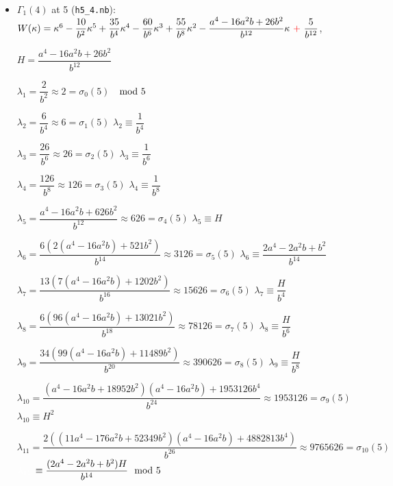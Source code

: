 \documentclass{rs}
\theoremstyle{definition}
\theoremstyle{remark}
\newcommand{\md}{~~{\rm mod}~}
\newcommand{\G}{\Gamma}
\newcommand{\K}{\kappa}
\renewcommand{\l}{\lambda}
\newcommand{\si}{\sigma}
\renewcommand{\=}{\approx}
\renewcommand{\-}{\sim}
\numberwithin{equation}{section}
\numberwithin{thm}{section}
\begin{document}
\begin{itemize}
 $\l_{-5} = -\dfrac{a^2 (a^{18} - 95 a^{15} b + 3485 a^{12} b^2 - 61465 a^9 b^3 + 524355 a^6 b^4 - 1871224 a^3 b^5 + 1739375 b^6)}{-15625} \= \dfrac{15624}{15625} = -(\si_{-6}(5) - 2)$ 

 $\l_{-6} = (a^{24} - 114 a^{21} b + 5265 a^{18} b^2 - 125780 a^{15} b^3 + 1641540 a^{12} b^4 - 11300694 a^9 b^5 + 35837606 a^6 b^6 - 36714000 a^3 b^7 + 3018750 b^8) / 78125 
 \= \dfrac{78126}{78125} = \si_{-7}(5)$ 

 \item $\G_1(4)$ at 5 (\texttt{h5\_4.nb}): $W(\K) = \K^6 - \dfrac{10}{b^2} \K^5 + \dfrac{35}{b^4} \K^4 - \dfrac{60}{b^6} \K^3 + \dfrac{55}{b^8} \K^2 
 - \dfrac{a^4 - 16 a^2 b + 26 b^2}{b^{12}} \K ~\textcolor{red}{+}~ \dfrac{5}{b^{12}}$, 

 \hfill $H = \dfrac{a^4 - 16 a^2 b + 26 b^2}{b^{12}}$ 

 $\l_1 = \dfrac{2}{b^2} \= 2 = \si_0(5)$ \hfill $\md 5$

 $\l_2 = \dfrac{6}{b^4} \= 6 = \si_1(5)$ \hfill $\l_2 \equiv \dfrac{1}{b^4}$ 

 $\l_3 = \dfrac{26}{b^6} \= 26 = \si_2(5)$ \hfill $\l_3 \equiv \dfrac{1}{b^6}$ 

 $\l_4 = \dfrac{126}{b^8} \= 126 = \si_3(5)$ \hfill $\l_4 \equiv \dfrac{1}{b^8}$ 

 $\l_5 = \dfrac{a^4 - 16 a^2 b + 626 b^2}{b^{12}} \= 626 = \si_4(5)$ \hfill $\l_5 \equiv H$ 

 $\l_6 = \dfrac{6 (2 (a^4 - 16 a^2 b) + 521 b^2)}{b^{14}} \= 3126 = \si_5(5)$ \hfill $\l_6 \equiv \dfrac{2 a^4 - 2 a^2 b + b^2}{b^{14}}$ 

 $\l_7 = \dfrac{13 (7 (a^4 - 16 a^2 b) + 1202 b^2)}{b^{16}} \= 15626 = \si_6(5)$ \hfill $\l_7 \equiv \dfrac{H}{b^4}$ 

 $\l_8 = \dfrac{6 (96 (a^4 - 16 a^2 b) + 13021 b^2)}{b^{18}} \= 78126 = \si_7(5)$ \hfill $\l_8 \equiv \dfrac{H}{b^6}$ 

 $\l_9 = \dfrac{34 (99 (a^4 - 16 a^2 b) + 11489 b^2)}{b^{20}} \= 390626 = \si_8(5)$ \hfill $\l_9 \equiv \dfrac{H}{b^8}$ 

 $\l_{10} = \dfrac{(a^4 - 16 a^2 b + 18952 b^2) (a^4 - 16 a^2 b) + 1953126 b^4}{b^{24}} \= 1953126 = \si_9(5)$ \hfill $\l_{10} \equiv H^2$ 

 $\l_{11} = \dfrac{2 ((11 a^4 - 176 a^2 b + 52349 b^2) (a^4 - 16 a^2 b) + 4882813 b^4)}{b^{26}} \= 9765626 = \si_{10}(5)$ \\
 $\textcolor{white}{\l_{11}~\!} \equiv \dfrac{(2 a^4 - 2 a^2 b + b^2) H}{b^{14}} \md 5$ 


\end{itemize}
\end{document}
